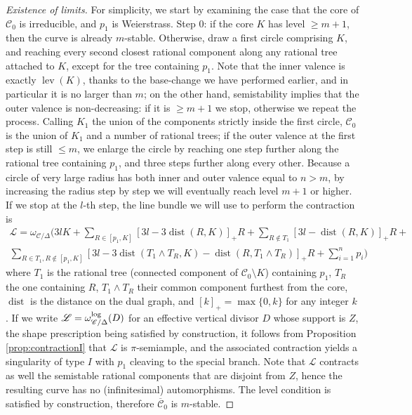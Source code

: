 \documentclass{compositio}
\newcommand{\dvr}{\Delta}
\newcommand{\dist}{\operatorname{dist}}
\newcommand{\lev}{\operatorname{lev}}
\theoremstyle{plain}
\theoremstyle{definition}
\theoremstyle{remark}
\begin{document}
\begin{proof}[Existence of limits]
  For simplicity, we start by examining the case that the core of $\mathcal C_0$ is irreducible, and $p_1$ is Weierstrass. Step $0$: if the core $K$ has level $\geq m+1$, then the curve is already $m$-stable. Otherwise, draw a first circle comprising $K$, and reaching every second closest rational component along any rational tree attached to $K$, except for the tree containing $p_1$. Note that the inner valence is exactly $\lev(K)$, thanks to the base-change we have performed earlier, and in particular it is no larger than $m$; on the other hand, semistability implies that the outer valence is non-decreasing: if it is $\geq m+1$ we stop, otherwise we repeat the process. Calling $K_1$ the union of the components strictly inside the first circle, $\mathcal C_0$ is the union of $K_1$ and a number of rational trees; if the outer valence at the first step is still $\leq m$, we enlarge the circle by reaching one step further along the rational tree containing $p_1$, and three steps further along every other. Because a circle of very large radius has both inner and outer valence equal to $n>m$, by increasing the radius step by step we will eventually reach level $m+1$ or higher. If we stop at the $l$-th step, the line bundle we will use to perform the contraction is
  \begin{multline*}
  \mathcal L=\omega_{\mathcal C/\dvr}(3l K + \sum_{R\in [p_1,K]}[3l-3\dist(R,K)]_+R +\sum_{R\notin T_1}[3l-\dist(R,K)]_+R +\\
  \sum_{R\in T_1,R\notin [p_1,K]}[3l-3\dist(T_1\wedge T_R,K)-\dist(R,T_1\wedge T_R)]_+R+ \sum_{i=1}^np_i)
  \end{multline*}
  where $T_1$ is the rational tree (connected component of $\mathcal C_0\setminus K$) containing $p_1$, $T_R$ the one containing $R$, $T_1\wedge T_R$ their common component furthest from the core, $\dist$ is the distance on the dual graph, and $[k]_+=\max\{0,k\}$ for any integer $k$. If we write $\mathcal L=\omega_{\mathcal C/\dvr}^{\rm{log}}(D)$ for an effective vertical divisor $D$ whose support is $Z$, the shape prescription being satisfied by construction, it follows from Proposition \ref{prop:contractionI} that $\mathcal L$ is $\pi$-semiample, and the associated contraction yields a singularity of type $I$ with $p_1$ cleaving to the special branch. Note that $\mathcal L$ contracts as well the semistable rational components that are disjoint from $Z$, hence the resulting curve has no (infinitesimal) automorphisms. The level condition is satisfied by construction, therefore $\overline{\mathcal C}_0$ is $m$-stable.
  

\end{proof}
\end{document}
